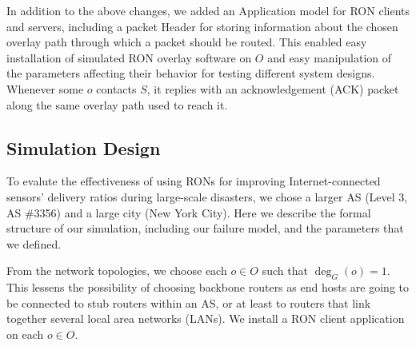 \documentclass[conference]{IEEEtran}
\begin{document}
In addition to the above changes, we added an Application model for RON clients and servers, including a packet Header for storing information about the chosen overlay path through which a packet should be routed.
This enabled easy installation of simulated RON overlay software on $O$ and easy manipulation of the parameters affecting their behavior for testing different system designs.
Whenever some $o$ contacts $S$, it replies with an acknowledgement (ACK) packet along the same overlay path used to reach it.
% 

\subsection{Simulation Design}

To evalute the effectiveness of using RONs for improving Internet-connected sensors' delivery ratios during large-scale disasters, we chose a larger AS (Level 3, AS \#3356) and a large city (New York City).
Here we describe the formal structure of our simulation, including our failure model, and the parameters that we defined.

From the network topologies, we choose each $o \in O$ such that $\deg_G (o) = 1$.
This lessens the possibility of choosing backbone routers as end hosts are going to be connected to stub routers within an AS, or at least to routers that link together several local area networks (LANs).
We install a RON client application on each $o \in O$.
\end{document}
